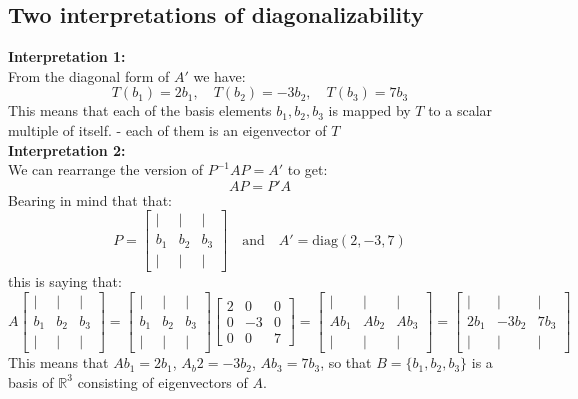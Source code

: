 \documentclass[a4paper, 9pt]{extarticle}
\begin{document}
\subsection{Two interpretations of diagonalizability}
\textbf{Interpretation 1:} \\
From the diagonal form of $A'$ we have:
$$T(b_1) = 2b_1, \quad T(b_2) = -3b_2, \quad T(b_3) = 7b_3$$
This means that each of the basis elements $b_1, b_2, b_3$ is mapped by $T$ to a scalar multiple of itself. - each of them is an eigenvector of $T$ \\[2ex]
\textbf{Interpretation 2:} \\
We can rearrange the version of $P^{-1}AP = A'$ to get:
$$
  AP = P'A
$$
Bearing in mind that that:
$$
  P=
  \begin{bmatrix}
    |   & |   & |   \\
    b_1 & b_2 & b_3 \\
    |   & |   & |
  \end{bmatrix}
  \quad\text{and}\quad
  A'  = \text{diag}(2,-3,7)
$$
this is saying that:
$$
  A\begin{bmatrix}
    |   & |   & |   \\
    b_1 & b_2 & b_3 \\
    |   & |   & |
  \end{bmatrix}
  =
  \begin{bmatrix}
    |   & |   & |   \\
    b_1 & b_2 & b_3 \\
    |   & |   & |
  \end{bmatrix}
  \begin{bmatrix}
    2 & 0  & 0 \\
    0 & -3 & 0 \\
    0 & 0  & 7
  \end{bmatrix}
  =
  \begin{bmatrix}
    |    & |    & |    \\
    Ab_1 & Ab_2 & Ab_3 \\
    |    & |    & |
  \end{bmatrix}
  =
  \begin{bmatrix}
    |    & |     & |    \\
    2b_1 & -3b_2 & 7b_3 \\
    |    & |     & |
  \end{bmatrix}
$$
This means that $Ab_1 = 2b_1$, $A_b2 = -3b_2$, $Ab_3 = 7b_3$, so that $B = \{b_1, b_2, b_3\}$ is a basis of $\mathbb{R}^3$ consisting of eigenvectors of $A$.
\end{document}
